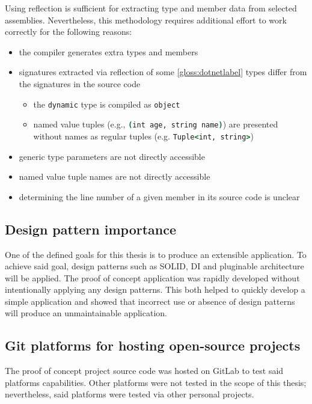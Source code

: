 Using reflection is sufficient for extracting type and member data from selected assemblies. Nevertheless, this methodology requires additional effort to work correctly for the following reasons:
\begin{itemize}
    \item the compiler generates extra types and members
    \item signatures extracted via reflection of some \ref{gloss:dotnetlabel} types differ from the signatures in the source code
    \begin{itemize}
        \item the \lstinline[language=csh]{dynamic} type is compiled as \lstinline[language=csh]{object}
        \item named value tuples (e.g., \lstinline[language=csh]{(int age, string name)}) are presented without names as regular tuples (e.g. \lstinline[language=csh]{Tuple<int, string>})
    \end{itemize}
    \item generic type parameters are not directly accessible
    \item named value tuple names are not directly accessible
    \item determining the line number of a given member in its source code is unclear
\end{itemize}

\subsection{Design pattern importance}

One of the defined goals for this thesis is to produce an extensible application. To achieve said goal, design patterns such as SOLID, DI and pluginable architecture will be applied.
The proof of concept application was rapidly developed without intentionally applying any design patterns. This both helped to quickly develop a simple application and showed that incorrect use or absence of design patterns will produce an unmaintainable application.

\subsection{Git platforms for hosting open-source projects}

The proof of concept project source code was hosted on GitLab to test said platforms capabilities. Other platforms were not tested in the scope of this thesis; nevertheless, said platforms were tested via other personal projects.

